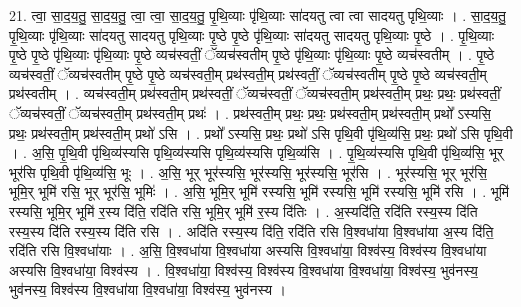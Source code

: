\documentclass[17pt]{extarticle}
\begin{document}
21. त्वा॒ सा॒द॒य॒तु॒ सा॒द॒य॒तु॒ त्वा॒ त्वा॒ सा॒द॒य॒तु॒ पृ॒थि॒व्याः पृ॑थि॒व्याः सा॑दयतु त्वा त्वा सादयतु पृथि॒व्याः । . सा॒द॒य॒तु॒ पृ॒थि॒व्याः पृ॑थि॒व्याः सा॑दयतु सादयतु पृथि॒व्याः पृ॒ष्ठे पृ॒ष्ठे पृ॑थि॒व्याः सा॑दयतु सादयतु पृथि॒व्याः पृ॒ष्ठे । . पृ॒थि॒व्याः पृ॒ष्ठे पृ॒ष्ठे पृ॑थि॒व्याः पृ॑थि॒व्याः पृ॒ष्ठे व्यच॑स्वतीं॒ ॅव्यच॑स्वतीम् पृ॒ष्ठे पृ॑थि॒व्याः पृ॑थि॒व्याः पृ॒ष्ठे व्यच॑स्वतीम् । . पृ॒ष्ठे व्यच॑स्वतीं॒ ॅव्यच॑स्वतीम् पृ॒ष्ठे पृ॒ष्ठे व्यच॑स्वती॒म् प्रथ॑स्वती॒म् प्रथ॑स्वतीं॒ ॅव्यच॑स्वतीम् पृ॒ष्ठे पृ॒ष्ठे व्यच॑स्वती॒म् प्रथ॑स्वतीम् । . व्यच॑स्वती॒म् प्रथ॑स्वती॒म् प्रथ॑स्वतीं॒ ॅव्यच॑स्वतीं॒ ॅव्यच॑स्वती॒म् प्रथ॑स्वती॒म् प्रथः॒ प्रथः॒ प्रथ॑स्वतीं॒ ॅव्यच॑स्वतीं॒ ॅव्यच॑स्वती॒म् प्रथ॑स्वती॒म् प्रथः॑ । . प्रथ॑स्वती॒म् प्रथः॒ प्रथः॒ प्रथ॑स्वती॒म् प्रथ॑स्वती॒म् प्रथो᳚ ऽस्यसि॒ प्रथः॒ प्रथ॑स्वती॒म् प्रथ॑स्वती॒म् प्रथो॑ ऽसि । . प्रथो᳚ ऽस्यसि॒ प्रथः॒ प्रथो॑ ऽसि पृथि॒वी पृ॑थि॒व्य॑सि॒ प्रथः॒ प्रथो॑ ऽसि पृथि॒वी । . अ॒सि॒ पृ॒थि॒वी पृ॑थि॒व्य॑स्यसि पृथि॒व्य॑स्यसि पृथि॒व्य॑स्यसि पृथि॒व्य॑सि । . पृ॒थि॒व्य॑स्यसि पृथि॒वी पृ॑थि॒व्य॑सि॒ भूर् भूर॑सि पृथि॒वी पृ॑थि॒व्य॑सि॒ भूः । . अ॒सि॒ भूर् भूर॑स्यसि॒ भूर॑स्यसि॒ भूर॑स्यसि॒ भूर॑सि । . भूर॑स्यसि॒ भूर् भूर॑सि॒ भूमि॒र् भूमि॑ रसि॒ भूर् भूर॑सि॒ भूमिः॑ । . अ॒सि॒ भूमि॒र् भूमि॑ रस्यसि॒ भूमि॑ रस्यसि॒ भूमि॑ रस्यसि॒ भूमि॑ रसि । . भूमि॑ रस्यसि॒ भूमि॒र् भूमि॑ र॒स्य दि॑ति॒ रदि॑ति रसि॒ भूमि॒र् भूमि॑ र॒स्य दि॑तिः । . अ॒स्यदि॑ति॒ रदि॑ति रस्य॒स्य दि॑ति रस्य॒स्य दि॑ति रस्य॒स्य दि॑ति रसि । . अदि॑ति रस्य॒स्य दि॑ति॒ रदि॑ति रसि वि॒श्वधा॑या वि॒श्वधा॑या अ॒स्य दि॑ति॒ रदि॑ति रसि वि॒श्वधा॑याः । . अ॒सि॒ वि॒श्वधा॑या वि॒श्वधा॑या अस्यसि वि॒श्वधा॑या॒ विश्व॑स्य॒ विश्व॑स्य वि॒श्वधा॑या अस्यसि वि॒श्वधा॑या॒ विश्व॑स्य । . वि॒श्वधा॑या॒ विश्व॑स्य॒ विश्व॑स्य वि॒श्वधा॑या वि॒श्वधा॑या॒ विश्व॑स्य॒ भुव॑नस्य॒ भुव॑नस्य॒ विश्व॑स्य वि॒श्वधा॑या वि॒श्वधा॑या॒ विश्व॑स्य॒ भुव॑नस्य । \newline
\end{document}
